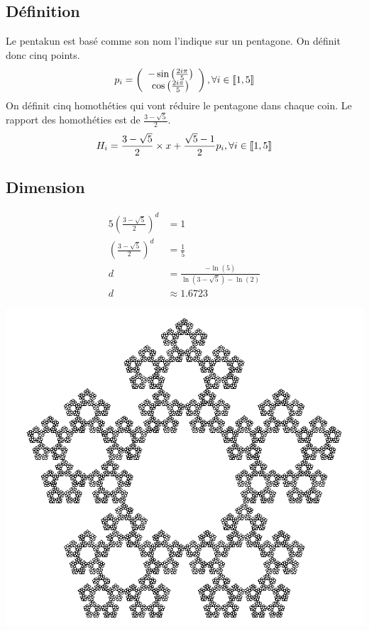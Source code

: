 \documentclass[a4paper, 12pt]{report}
\begin{document}
			\subsection{Définition}
				Le pentakun est basé comme son nom l'indique sur un pentagone. On définit donc cinq points.
				\begin{equation*}
					p_i=\left(\begin{array}{ccc}
							-\sin\left(\frac{2i\pi}{5}\right)\\
							\cos\left(\frac{2i\pi}{5}\right)\\
						\end{array}\right)
						,\forall i\in\textrm{\textlbrackdbl} 1,5\textrm{\textrbrackdbl}
			\end{equation*}
				On définit cinq homothéties qui vont réduire le pentagone dans chaque coin. Le rapport des homothéties est de $\frac{3-\sqrt{5}}{2}$.
				\begin{equation*}
					H_i=\frac{3-\sqrt{5}}{2}\times x+\frac{\sqrt{5}-1}{2}p_i,\forall i\in\textrm{\textlbrackdbl} 1,5\textrm{\textrbrackdbl}
				\end{equation*}
			\subsection{Dimension}
				\begin{align*}
					 5\left(\frac{3-\sqrt{5}}{2}\right)^d	&=1\\
					 \left(\frac{3-\sqrt{5}}{2}\right)^d	&=\frac{1}{5}\\
														d	&=\frac{-\ln(5)}{\ln(3-\sqrt{5})-\ln(2)}\\
														d	&\approx 1.6723
				\end{align*}
				\begin{center}
					\includegraphics[scale=0.5]{Images/pentakun.png}
				\end{center}
				
\end{document}
